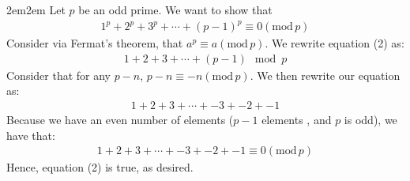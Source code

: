 \documentclass[10pt,oneside]{book}
\newcommand{\gmod}{\text{mod}\,}
\let\endoldproof\endproof
\renewenvironment{proof}[1][\proofname]
  {\vspace{0.2cm}\begin{adjustwidth}{2em}{2em}
   \oldproof[#1]}
  {\endoldproof
\end{adjustwidth}}
\begin{document}
\begin{enumerate}
\begin{enumerate}
		\begin{proof}
			Let $p$ be an odd prime. We want to show that 
			\begin{align}
				1^p + 2^p + 3^p + \cdots + (p-1)^p \equiv 0 (\gmod p)
			\end{align}
			Consider via Fermat's theorem, that $a^p \equiv a(\gmod p)$. We rewrite equation (2) as:
			\begin{align*}
				1+2+3+\cdots + (p-1) \mod p
			\end{align*}
			Consider that for any $p-n$, $p-n\equiv -n(\gmod p)$. We then rewrite our equation as:
			\begin{align*}
				1 + 2+ 3 + \cdots + -3 + -2 + -1
			\end{align*}
			Because we have an even number of elements ($p-1$ elements , and $p$ is odd), we have that:
			\begin{align*}
				1 + 2+ 3 + \cdots + -3 + -2 + -1 \equiv 0 (\gmod p)
			\end{align*}
	Hence, equation (2) is true, as desired. 
		\end{proof}
	\end{enumerate}
\end{enumerate}
\end{document}
